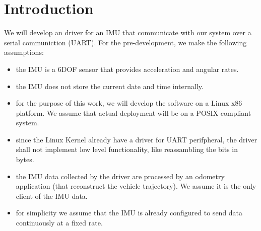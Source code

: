 \section{Introduction}
We will develop an driver for an IMU that communicate with our system over a serial communiction (UART).
For the pre-development, we make the following assumptions:
\begin{itemize}
    \item the IMU is a 6DOF sensor that provides acceleration and angular rates.
    \item the IMU does not store the current date and time internally.
    \item for the purpose of this work, we will develop the software on a Linux x86 platform. We assume that actual deployment will be on a POSIX compliant system.
    \item since the Linux Kernel already have a driver for UART perifpheral, the driver shall not implement low level functionality, like reassambling the bits in bytes.
    \item the IMU data collected by the driver are processed by an odometry application (that reconstruct the vehicle trajectory).
    We assume it is the only client of the IMU data.
    \item for simplicity we assume that the IMU is already configured to send data continuously at a fixed rate.
\end{itemize}
